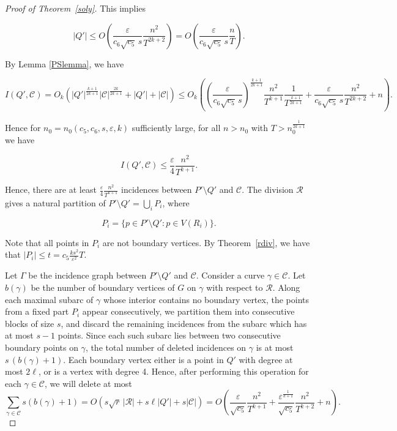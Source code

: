 \documentclass[11pt]{article}
\theoremstyle{plain}
\theoremstyle{definition}
\theoremstyle{remark}
\begin{document}
\begin{proof}[Proof of Theorem~\ref{soly}]
\noindent  This implies

\[
|Q'|
\le
O\!\left(
\frac{\varepsilon}{c_6\sqrt{c_5}\,s}
\frac{n^2}{T^{2k+2}}
\right)=O\!\left(
\frac{\varepsilon}{c_6\sqrt{c_5}\,s}
\frac{n}{T}
\right).
\]

\noindent By Lemma \ref{PSlemma}, we have

$$ I(Q',\mathcal C) = O_k\left(
|Q'|^{\frac{k + 1}{2k + 1}}
|\mathcal C|^{\frac{2k}{2k + 1}}
+|Q'|+|\mathcal  C|
\right) \leq  O_k\!\left(
\left(\frac{\varepsilon}{c_6\sqrt{c_5}\,s}\right)^{\frac{k+1}{2k+1}}
\frac{n^2}{T^{k+1}}\frac{1}{T^{\frac{k+1}{2k+1}}}
+
\frac{\varepsilon }{c_6\sqrt{c_5}\,s}\frac{n^2}{T^{2k+2}}
+
n
\right).$$

\noindent Hence for $n_0 = n_0(c_5,c_6,s, \varepsilon, k)$ sufficiently large, for all $n > n_0$ with $T>n^{\frac{1}{2k+1}}_0$ we have



\[
I(Q',\mathcal C) \leq \frac{\varepsilon}{4}\frac{n^2}{T^{k+1}}.\]



Hence, there are at least $\frac{\varepsilon}{4}\frac{n^2}{T^{k+1}}$ incidences between $P'\setminus Q'$ and $\mathcal C$.  The division $\mathcal R$ gives a natural partition of $P'\setminus Q' = \bigcup_i P_i$, where 

$$P_i = \{p \in P'\setminus Q': p \in V(R_i)\}.$$

\noindent  Note that all points in $P_i$ are not boundary vertices.   By Theorem~\ref{rdiv}, we have that $|P_i|  \leq t =  c_5\frac{ks^2}{\varepsilon^2}T$. 




Let $\Gamma$ be the incidence graph between $P'\setminus Q'$ and $\mathcal C$. Consider a curve $\gamma \in \mathcal{C}$.  Let $b(\gamma)$ be the number of boundary vertices of $G$ on $\gamma$ with respect to $\mathcal{R}$.  Along each maximal subarc of \(\gamma\) whose interior contains no boundary vertex, the points from a fixed part \(P_i\) appear consecutively, we partition them into consecutive blocks of size \(s\), and discard the remaining incidences from the subarc which has at most $s-1$ points. Since each such subarc lies between two consecutive boundary points on \(\gamma\), the total number of deleted incidences on \(\gamma\) is at most \(s\,(b(\gamma)+1)\).  Each boundary vertex either is a point in $Q'$ with degree at most $2\ell$, or is a vertex with degree 4. Hence, after performing this operation for each $\gamma \in \mathcal C$, we will delete at most
\[
\sum\limits_{\gamma \in \mathcal C} s(b(\gamma)  +1)  = O\!\left(s\sqrt r\,|\mathcal R|+s\ell|Q'|+s|\mathcal C|\right)
=
O\!\left(
\frac{\varepsilon}{\sqrt{c_5}}
\frac{n^2}{T^{k+1}}
+
\frac{\varepsilon^{\frac{1}{k+1}}}{\sqrt{c_5}}
\frac{n^2}{T^{k+2}}+n
\right).
\]
 

\end{proof}
\end{document}
